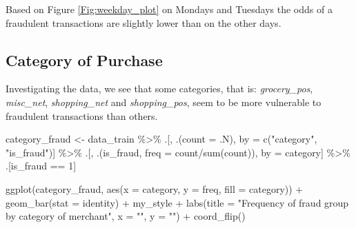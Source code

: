 \documentclass[
]{report}
\newenvironment{Shaded}{\begin{snugshade}}{\end{snugshade}}
\newcommand{\AttributeTok}[1]{\textcolor[rgb]{0.77,0.63,0.00}{#1}}
\newcommand{\DecValTok}[1]{\textcolor[rgb]{0.00,0.00,0.81}{#1}}
\newcommand{\FunctionTok}[1]{\textcolor[rgb]{0.00,0.00,0.00}{#1}}
\newcommand{\NormalTok}[1]{#1}
\newcommand{\OtherTok}[1]{\textcolor[rgb]{0.56,0.35,0.01}{#1}}
\newcommand{\SpecialCharTok}[1]{\textcolor[rgb]{0.00,0.00,0.00}{#1}}
\newcommand{\StringTok}[1]{\textcolor[rgb]{0.31,0.60,0.02}{#1}}
\begin{document}
Based on Figure \ref{Fig:weekday_plot} on Mondays and Tuesdays the odds
of a fraudulent transactions are slightly lower than on the other days.

\hypertarget{category-of-purchase}{%
\subsection{Category of Purchase}\label{category-of-purchase}}

Investigating the data, we see that some categories, that is:
\emph{grocery\_pos}, \emph{misc\_net}, \emph{shopping\_net} and
\emph{shopping\_pos}, seem to be more vulnerable to fraudulent
transactions than others.

\begin{Shaded}
\begin{Highlighting}[]
\NormalTok{category\_fraud }\OtherTok{\textless{}{-}}\NormalTok{ data\_train }\SpecialCharTok{\%\textgreater{}\%} 
\NormalTok{  .[, .(}\AttributeTok{count =}\NormalTok{ .N), by }\OtherTok{=} \FunctionTok{c}\NormalTok{(}\StringTok{"category"}\NormalTok{, }\StringTok{"is\_fraud"}\NormalTok{)] }\SpecialCharTok{\%\textgreater{}\%}
\NormalTok{  .[, .(is\_fraud, }\AttributeTok{freq =}\NormalTok{ count}\SpecialCharTok{/}\FunctionTok{sum}\NormalTok{(count)), by }\OtherTok{=}\NormalTok{ category] }\SpecialCharTok{\%\textgreater{}\%}
\NormalTok{  .[is\_fraud }\SpecialCharTok{==} \DecValTok{1}\NormalTok{]}
\end{Highlighting}
\end{Shaded}

\begin{Shaded}
\begin{Highlighting}[]
\FunctionTok{ggplot}\NormalTok{(category\_fraud, }\FunctionTok{aes}\NormalTok{(}\AttributeTok{x =}\NormalTok{ category, }\AttributeTok{y =}\NormalTok{ freq, }\AttributeTok{fill =}\NormalTok{ category)) }\SpecialCharTok{+}
  \FunctionTok{geom\_bar}\NormalTok{(}\AttributeTok{stat =} \StringTok{\textquotesingle{}identity\textquotesingle{}}\NormalTok{) }\SpecialCharTok{+}
\NormalTok{  my\_style }\SpecialCharTok{+}
  \FunctionTok{labs}\NormalTok{(}\AttributeTok{title =} \StringTok{"Frequency of fraud group by category of merchant"}\NormalTok{,}
       \AttributeTok{x =} \StringTok{""}\NormalTok{,}
       \AttributeTok{y =} \StringTok{""}\NormalTok{) }\SpecialCharTok{+}
  \FunctionTok{coord\_flip}\NormalTok{()}
\end{Highlighting}
\end{Shaded}
\end{document}

